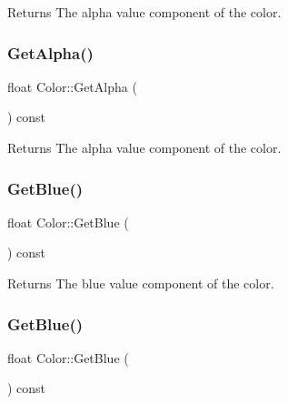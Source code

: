 \begin{DoxyReturn}{Returns}
The alpha value component of the color. 
\end{DoxyReturn}
\mbox{\label{classColor_a1eb5d3ba0276e2b555211aae3cd500b6}} 
\subsubsection{\texorpdfstring{Get\+Alpha()}{GetAlpha()}\hspace{0.1cm}{\footnotesize\ttfamily [2/2]}}
{\footnotesize\ttfamily float Color\+::\+Get\+Alpha (\begin{DoxyParamCaption}{ }\end{DoxyParamCaption}) const\hspace{0.3cm}{\ttfamily [inline]}}

\begin{DoxyReturn}{Returns}
The alpha value component of the color. 
\end{DoxyReturn}
\mbox{\label{classColor_a79e225ea938465a072b697b9431f8150}} 
\subsubsection{\texorpdfstring{Get\+Blue()}{GetBlue()}\hspace{0.1cm}{\footnotesize\ttfamily [1/2]}}
{\footnotesize\ttfamily float Color\+::\+Get\+Blue (\begin{DoxyParamCaption}{ }\end{DoxyParamCaption}) const\hspace{0.3cm}{\ttfamily [inline]}}

\begin{DoxyReturn}{Returns}
The blue value component of the color. 
\end{DoxyReturn}
\mbox{\label{classColor_a79e225ea938465a072b697b9431f8150}} 
\subsubsection{\texorpdfstring{Get\+Blue()}{GetBlue()}\hspace{0.1cm}{\footnotesize\ttfamily [2/2]}}
{\footnotesize\ttfamily float Color\+::\+Get\+Blue (\begin{DoxyParamCaption}{ }\end{DoxyParamCaption}) const\hspace{0.3cm}{\ttfamily [inline]}}

